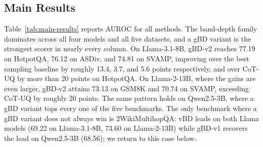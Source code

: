 \documentclass[letterpaper]{article} %
\begin{document}
\subsection{Main Results}
\label{sec:exp:main}

Table~\ref{tab:main-results} reports AUROC for all methods. The band-depth family
dominates across all four models and all five datasets, and a gBD variant is the
strongest scorer in nearly every column. On Llama-3.1-8B, gBD-v2 reaches 77.19 on
HotpotQA, 76.12 on ASDiv, and 74.81 on SVAMP, improving over the best sampling
baseline by roughly 13.4, 3.7, and 5.6 points respectively, and over CoT-UQ by more
than 20 points on HotpotQA. On Llama-2-13B, where the gains are
even larger, gBD-v2 attains 73.13 on GSM8K and 70.74 on SVAMP, exceeding CoT-UQ
by roughly 20 points. The same pattern holds on Qwen2.5-3B, where a gBD variant
tops every one of the five benchmarks. The only benchmark where a gBD variant does
not always win is 2WikiMultihopQA: vBD leads on both Llama models (69.22 on
Llama-3.1-8B, 73.60 on Llama-2-13B) while gBD-v1 recovers the lead on Qwen2.5-3B
(68.56); we return to this case below.
\end{document}
